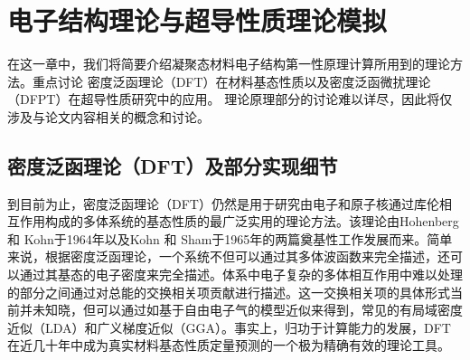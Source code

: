 \chapter{电子结构理论与超导性质理论模拟}\label{chapter_theory}
\newcommand{\ubm}[1]{\underline{\bm{#1}}}

在这一章中，我们将简要介绍凝聚态材料电子结构第一性原理计算所用到的理论方法。重点讨论
密度泛函理论（DFT）在材料基态性质以及密度泛函微扰理论（DFPT）在超导性质研究中的应用。
理论原理部分的讨论难以详尽，因此将仅涉及与论文内容相关的概念和讨论。

\section{密度泛函理论（DFT）及部分实现细节}

到目前为止，密度泛函理论（DFT）仍然是用于研究由电子和原子核通过库伦相互作用构成的多体系统的基态性质的最广泛实用的理论方法。该理论由Hohenberg 和 Kohn\cite{hohenberg1964inhomogeneous}于1964年以及Kohn 和 Sham\cite{kohn1965self}于1965年的两篇奠基性工作发展而来。简单来说，根据密度泛函理论，一个系统不但可以通过其多体波函数来完全描述，还可以通过其基态的电子密度来完全描述。体系中电子复杂的多体相互作用中难以处理的部分之间通过对总能的交换相关项贡献进行描述。这一交换相关项的具体形式当前并未知晓，但可以通过如基于自由电子气的模型近似来得到，常见的有局域密度近似（LDA）和广义梯度近似（GGA）。事实上，归功于计算能力的发展，DFT在近几十年中成为真实材料基态性质定量预测的一个极为精确有效的理论工具。

